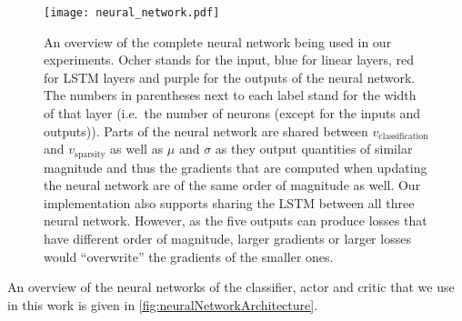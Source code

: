 \documentclass[conference]{IEEEtran}
\begin{document}
\begin{figure}
\centering
  \texttt{[image: neural\_network.pdf]}
  \caption{An overview of the complete neural network being used in our experiments. Ocher stands for the input, blue for linear layers, red for LSTM layers and purple for the outputs of the neural network. The numbers in parentheses next to each label stand for the width of that layer (i.e.~the number of neurons (except for the inputs and outputs)). Parts of the neural network are shared between $v_\text{classification}$ and $v_\text{sparsity}$ as well as $\mu$ and $\sigma$ as they output quantities of similar magnitude and thus the gradients that are computed when updating the neural network are of the same order of magnitude as well. Our implementation also supports sharing the LSTM between all three neural network. However, as the five outputs can produce losses that have different order of magnitude, larger gradients or larger losses would ``overwrite'' the gradients of the smaller ones.}
  \label{fig:neuralNetworkArchitecture}
\end{figure}

An overview of the neural networks of the classifier, actor and critic that we use in this work is given in \autoref{fig:neuralNetworkArchitecture}.
\end{document}
